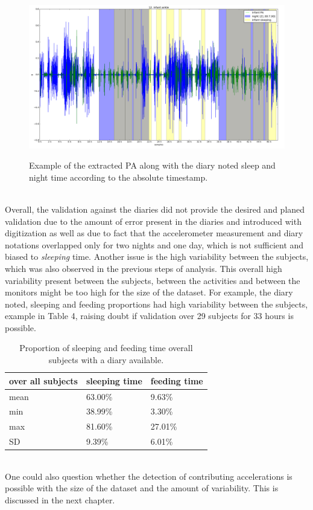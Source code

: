 \documentclass{article}
\begin{document}
{ \begin{figure}[h!]
\includegraphics[width=15cm, height=7cm]{12PA.png}
\caption{Example of the extracted PA along with the diary noted sleep and night time according to the absolute timestamp.}
\end{figure}
\\Overall, the validation against the diaries did not provide the desired and planed validation due to the amount of error present in the diaries and introduced with digitization as well as due to fact that the accelerometer measurement and diary notations overlapped only for two nights and one day, which is not sufficient and biased to \textit{sleeping} time. Another issue is the high variability between the subjects, which was also observed in the previous steps of analysis. This overall high variability present between the subjects, between the activities and between the monitors might be too high for the size of the dataset. For example, the diary noted, sleeping and feeding proportions had high variability between the subjects, example in Table 4, raising doubt if validation over 29 subjects for 33 hours is possible.
\begin{table}[h]
\centering
\begin{tabular}{|l|l|l|}
\hline
over all subjects & sleeping time & feeding time \\ \hline
mean              & 63.00\%       & 9.63\%       \\ \hline
min               & 38.99\%       & 3.30\%       \\ \hline
max               & 81.60\%       & 27.01\%      \\ \hline
SD                & 9.39\%        & 6.01\%       \\ \hline
\end{tabular}
\caption{Proportion of sleeping and feeding time overall subjects with a diary available.}
\end{table}
\\One could also question whether the detection of contributing accelerations is possible with the size of the dataset and the amount of variability. This is discussed in the next chapter.
}
\end{document}
